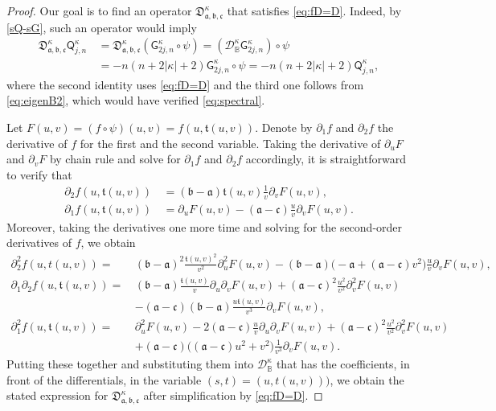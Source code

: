 \documentclass{amsart}
\theoremstyle{remark}
\def\sG{{\mathsf G}}
\def\sQ{{\mathsf Q}}
\def\fa{{\mathfrak a}}
\def\fb{{\mathfrak b}}
\def\fc{{\mathfrak c}}
\def\ft{{\mathfrak t}}
\def\fD{{\mathfrak D}}
\def\k{{\kappa}}
\def\CD{{\mathcal D}}
\def\BB{{\mathbb B}}
\def\f{\frac}
\begin{document}
\begin{proof}
Our goal is to find an operator $\fD_{\fa,\fb,\fc}^\k$ that satisfies \eqref{eq:fD=D}. 
Indeed, by \eqref{sQ-sG}, such an operator would imply 
\begin{align*}
  \fD_{\fa,\fb,\fc}^\k \sQ_{j,n}^\k \, & =  \fD_{\fa,\fb,\fc}^\k (\sG_{2j,n}^\k \circ \psi) 
       =  \left(\CD_\BB^\k \sG_{2j,n}^\k \right) \circ \psi \\ 
      &  = -n(n+2|\k|+2) \sG_{2j,n}^\k \circ \psi =  -n(n+2|\k|+2) \sQ_{j,n}^\k,  
\end{align*}
where the second identity uses \eqref{eq:fD=D} and the third one follows from \eqref{eq:eigenB2},
which would have verified \eqref{eq:spectral}. 

Let $F(u,v) = (f\circ \psi)(u,v) = f(u, \ft(u,v))$. Denote by $\partial_1f$ and $\partial_2f$ the derivative of 
$f$ for the first and the second variable. Taking the derivative of $\partial_u F$ and $\partial_v F$
by chain rule and solve for $\partial_1 f$ and $\partial_2 f$ accordingly, it is straightforward to verify that
\begin{align*}
  \partial_2 f(u,\ft(u,v)) \, &= (\fb - \fa) \ft(u,v) \frac{1}{v} \partial_v F(u,v), \\
  \partial_1 f(u, \ft(u,v)) \, &= \partial_u F(u,v) - (\fa - \fc) \frac{u}{v} \partial_v F(u,v).
\end{align*}
Moreover, taking the derivatives one more time and solving for the second-order derivatives of $f$, we
obtain 
\begin{align*}
  \partial_2^2 f(u, t(u,v)) = \, &  (\fb-\fa)^2 \f{\ft(u,v)^2}{v^2} \partial_u^2 F(u,v) - (\fb - \fa)\big(-\fa+ (\fa - \fc)v^2\big)
   \frac{u}{v} \partial_v F(u,v), \\
  \partial_1 \partial_2 f(u, \ft(u,v))  = \, & (\fb - \fa) \frac{\ft(u,v)}{v} \partial_u \partial_v F(u,v)
         + (\fa - \fc)^2  \frac{u^2}{v^2} \partial^2_v F(u,v)\\
             \, &  - (\fa - \fc)(\fb-\fa)  \frac{u \ft(u,v)}{v^3} \partial_v F(u,v), \\
    \partial_1^2 f(u, \ft(u,v)) = \, & \partial_u^2 F(u,v) -2 (\fa - \fc) \frac{u}{v} \partial_u \partial_v F(u,v) 
        + (\fa-\fc)^2  \frac{u^2}{v^2} \partial^2_v F(u,v) \\
     & +  (\fa - \fc) \big((\fa - \fc) u^2 + v^2\big) \frac{1}{v^3} \partial_v F(u,v).       
\end{align*}
Putting these together and substituting them into $\CD_\BB^\k$ that has the coefficients, in front of the differentials,
in the variable $(s,t) = (u,t(u,v)))$, we obtain the stated expression for $\fD_{\fa,\fb,\fc}^\k$ after simplification by
\eqref{eq:fD=D}.  
\end{proof}
\end{document}
